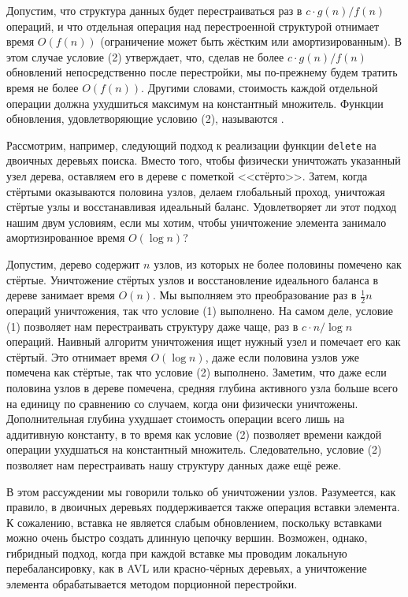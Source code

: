 Допустим, что структура данных будет перестраиваться раз в $c \cdot
g(n) / f(n)$ операций, и что отдельная операция над перестроенной
структурой отнимает время $O(f(n))$ (ограничение может быть жёстким
или амортизированным). В этом случае условие (2) утверждает, что,
сделав не более $c \cdot g(n) / f(n)$ обновлений непосредственно после
перестройки, мы по-прежнему будем тратить время не более
$O(f(n))$. Другими словами, стоимость каждой отдельной операции должна
ухудшиться максимум на константный множитель. Функции обновления,
удовлетворяющие условию (2), называются .

Рассмотрим, например, следующий подход к реализации функции
\lstinline!delete! на двоичных деревьях поиска. Вместо того, чтобы
физически уничтожать указанный узел дерева, оставляем его в дереве с
пометкой <<стёрто>>. Затем, когда стёртыми оказываются половина
узлов, делаем глобальный проход, уничтожая стёртые узлы и
восстанавливая идеальный баланс.  Удовлетворяет ли этот подход нашим
двум условиям, если мы хотим, чтобы уничтожение элемента занимало
амортизированное время $O(\log n)$?

Допустим, дерево содержит $n$ узлов, из которых не более половины
помечено как стёртые. Уничтожение стёртых узлов и восстановление
идеального баланса в дереве занимает время $O(n)$. Мы выполняем это
преобразование раз в $\frac{1}{2}n$ операций уничтожения, так что
условие (1) выполнено. На самом деле, условие (1) позволяет нам
перестраивать структуру даже чаще, раз в $c \cdot n / \log n$
операций.  Наивный алгоритм уничтожения ищет нужный узел и помечает его
как стёртый. Это отнимает время $O(\log n)$, даже если половина
узлов уже помечена как стёртые, так что условие (2) выполнено.
Заметим, что даже если половина узлов в дереве помечена, средняя
глубина активного узла больше всего на единицу по сравнению со
случаем, когда они физически уничтожены. Дополнительная глубина
ухудшает стоимость операции всего лишь на аддитивную константу, в то
время как условие (2) позволяет времени каждой операции ухудшаться на
константный множитель. Следовательно, условие (2) позволяет нам
перестраивать нашу структуру данных даже ещё реже.

В этом рассуждении мы говорили только об уничтожении
узлов. Разумеется, как правило, в двоичных деревьях поддерживается
также операция вставки элемента.  К сожалению, вставка не является
слабым обновлением, поскольку вставками можно очень быстро создать
длинную цепочку вершин.  Возможен, однако, гибридный подход, когда при
каждой вставке мы проводим локальную перебалансировку, как в
AVL или красно-чёрных деревьях, а уничтожение элемента обрабатывается
методом порционной перестройки.

